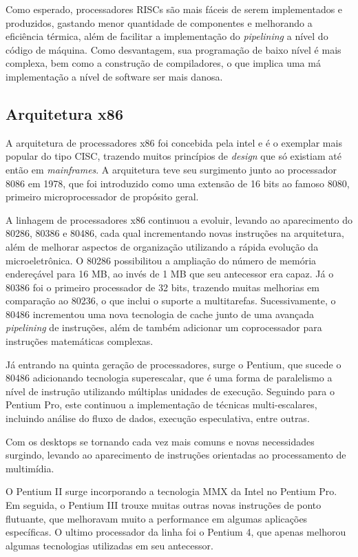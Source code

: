 \documentclass{article}
\begin{document}
Como esperado, processadores RISCs são mais fáceis de serem implementados e
produzidos, gastando menor quantidade de componentes e melhorando a eficiência
térmica, além de facilitar a implementação do \textit{pipelining} a nível do
código de máquina. Como desvantagem, sua programação de baixo nível é mais
complexa, bem como a construção de compiladores, o que implica uma má
implementação a nível de software ser mais danosa.

\subsection{Arquitetura x86} 
A arquitetura de processadores x86 foi concebida pela intel e é o exemplar mais
popular do tipo CISC, trazendo muitos princípios de \textit{design} que só
existiam até então em \textit{mainframes}. A arquitetura teve seu surgimento
junto ao processador 8086 em 1978, que foi introduzido como uma extensão de 16
bits ao famoso 8080, primeiro microprocessador de propósito geral.

A linhagem de processadores x86 continuou a evoluir, levando ao aparecimento do
80286, 80386 e 80486, cada qual incrementando novas instruções na arquitetura,
além de melhorar aspectos de organização utilizando a rápida evolução da
microeletrônica. O 80286 possibilitou a ampliação do número de memória
endereçável para 16 MB, ao invés de 1 MB que seu antecessor era capaz. Já o
80386 foi o primeiro processador de 32 bits, trazendo muitas melhorias em
comparação ao 80236, o que inclui o suporte a multitarefas. Sucessivamente, o
80486 incrementou uma nova tecnologia de cache junto de uma avançada
\textit{pipelining} de instruções, além de também adicionar um coprocessador
para instruções matemáticas complexas.

Já entrando na quinta geração de processadores, surge o Pentium, que sucede o
80486 adicionando tecnologia superescalar, que é uma forma de paralelismo a
nível de instrução utilizando múltiplas unidades de execução. Seguindo para o
Pentium Pro, este continuou a implementação de técnicas multi-escalares,
incluindo análise do fluxo de dados, execução especulativa, entre outras.

Com os desktops se tornando cada vez mais comuns e novas necessidades surgindo,
levando ao aparecimento de instruções orientadas ao processamento de multimídia.

O Pentium II surge incorporando a tecnologia MMX da Intel no Pentium Pro. Em
seguida, o Pentium III trouxe muitas outras novas instruções de ponto flutuante,
que melhoravam muito a performance em algumas aplicações específicas. O ultimo
processador da linha foi o Pentium 4, que apenas melhorou algumas tecnologias
utilizadas em seu antecessor.
\end{document}
